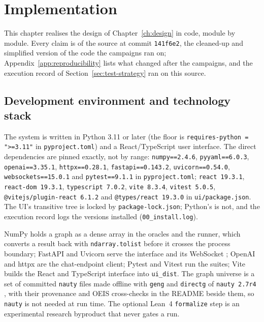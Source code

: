 \chapter{Implementation}
\label{ch:implementation}



This chapter realises the design of Chapter~\ref{ch:design} in code, module by
module. Every claim is of the source at commit \texttt{141f6e2}, the cleaned-up
and simplified version of the code the campaigns ran on; Appendix~\ref{app:reproducibility}
lists what changed after the campaigns, and the execution record of
Section~\ref{sec:test-strategy} ran on this source.

\section{Development environment and technology stack}
\label{sec:impl-stack}

The system is written in Python 3.11 or later \citep{python311} (the floor is
\texttt{requires-python = ">=3.11"} in \texttt{pyproject.toml}) and a
React/TypeScript user interface. The direct dependencies are pinned exactly, not
by range: \texttt{numpy==2.4.6},
\texttt{pyyaml==6.0.3}, \texttt{openai==3.35.1}, \texttt{httpx==0.28.1},
\texttt{fastapi==0.143.2}, \texttt{uvicorn==0.54.0}, \texttt{websockets==15.0.1}
and \texttt{pytest==9.1.1} in \texttt{pyproject.toml}; \texttt{react 19.3.1},
\texttt{react-dom 19.3.1}, \texttt{typescript 7.0.2}, \texttt{vite 8.3.4},
\texttt{vitest 5.0.5}, \texttt{@vitejs/plugin-react 6.1.2} and
\texttt{@types/react 19.3.0} in \texttt{ui/package.json}. The UI's transitive tree is
locked by \texttt{package-lock.json}; Python's is not, and the execution record
logs the versions installed (\texttt{00\_install.log}).

NumPy \citep{harris2020numpy} holds a graph as a dense array in the oracles and
the runner, which converts a result back with \texttt{ndarray.tolist} before it
crosses the process boundary; FastAPI \citep{fastapi} and Uvicorn serve the
interface and its WebSocket \citep{rfc6455}; OpenAI and httpx are the
chat-endpoint client; Pytest \citep{pytest} and Vitest \citep{vitest} run the
suites; Vite \citep{vite} builds the React \citep{react} and TypeScript
\citep{typescript} interface into \texttt{ui\_dist}. The graph universe is a set
of committed \texttt{nauty} files made offline with \texttt{geng} and
\texttt{directg} of \texttt{nauty 2.7r4} \citep{mckay2014nauty}, with their
provenance and OEIS cross-checks in the README beside them, so \texttt{nauty} is
not needed at run time. The optional Lean~4 \texttt{formalize} step is an
experimental research byproduct that never gates a run.

